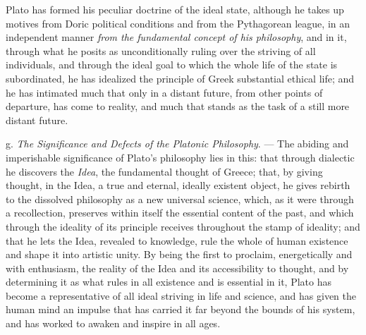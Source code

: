 Plato has formed his peculiar doctrine of the ideal state,
although he takes up motives from Doric political conditions and from
the Pythagorean league, in an independent manner
\emph{from the fundamental concept of his philosophy}, and in it,
through what he posits as unconditionally ruling over the striving of all
individuals, and through the ideal goal to which the whole life of the state
is subordinated, he has idealized the principle of Greek substantial ethical life;
and he has intimated much that only in a distant future, from other points of departure, has come to reality, and
much that stands as the task of a still more distant future.

\divrule

g. \emph{The Significance and Defects of the Platonic
Philosophy}. --- The abiding and imperishable
significance of Plato's philosophy lies in this: that through dialectic he discovers
the \emph{Idea}, the fundamental thought of Greece; that, by giving
thought, in the Idea, a true and eternal, ideally existent object, he gives rebirth to the dissolved philosophy as a new universal science, which, as it were through a recollection, preserves within itself the essential
content of the past, and which through the ideality of its principle receives throughout
the stamp of ideality; and that he lets the Idea, revealed to knowledge, rule the whole of human existence and shape
it into artistic unity. By being the first to proclaim, energetically and with enthusiasm,
the reality of the Idea and its accessibility to thought,
and by determining it as what rules in all existence
and is essential in it, Plato has become a representative of all ideal
striving in life and science, and has given the human mind an
impulse that has carried it far beyond the
bounds of his system, and has worked to awaken and inspire in all ages.

